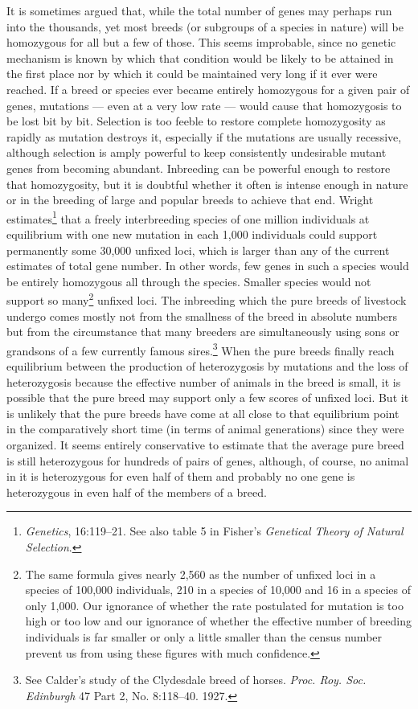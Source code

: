 It is sometimes argued that, while the total number of genes may
perhaps run into the thousands, yet most breeds (or subgroups of a
species in nature) will be homozygous for all but a few of those. This
seems improbable, since no genetic mechanism is known by which that
condition would be likely to be attained in the first place nor by which
it could be maintained very long if it ever were reached. If a breed or
species ever became entirely homozygous for a given pair of genes,
mutations --- even at a very low rate --- would cause that homozygosis to be
lost bit by bit. Selection is too feeble to restore complete homozygosity
as rapidly as mutation destroys it, especially if the mutations are usually
recessive, although selection is amply powerful to keep consistently
undesirable mutant genes from becoming abundant. Inbreeding can be
powerful enough to restore that homozygosity, but it is doubtful whether
it often is intense enough in nature or in the breeding of large and
popular breeds to achieve that end. Wright estimates\footnote{\textit{Genetics},
16:119--21. See also table 5 in Fisher's
\textit{Genetical Theory of Natural Selection}.} that a freely
interbreeding species of one million individuals at equilibrium with
one new mutation in each 1,000 individuals could support permanently
some 30,000 unfixed loci, which is larger than any of the current estimates
of total gene number. In other words, few genes in such a species
would be entirely homozygous all through the species. Smaller species
would not support so many\footnote{The same formula gives nearly 2,560 as
the number of unfixed loci in a species of 100,000 individuals, 210 in a species
of 10,000 and 16 in a species of only 1,000. Our ignorance of whether the rate
postulated for mutation is too high or too low and our ignorance of whether the
effective number of breeding individuals is far smaller or only a little smaller
than the census number prevent us from using these figures with much confidence.}
unfixed loci. The inbreeding which the pure breeds of livestock undergo comes
mostly not from the smallness of the breed in absolute numbers but from the
circumstance that many breeders are simultaneously using sons or grandsons of a
few currently famous sires.\footnote{See Calder's study of the Clydesdale breed
of horses. \textit{Proc. Roy. Soc. Edinburgh} 47 Part 2, No. 8:118--40. 1927.}
When the pure breeds finally reach equilibrium between the production of
heterozygosis by mutations and the loss of heterozygosis because the effective
number of animals in the breed is small, it is possible that the pure breed may
support only a few scores of unfixed loci. But it is unlikely that the pure
breeds have come at all close to that equilibrium point in the comparatively
short time (in terms of animal generations) since they were organized. It seems
entirely conservative to estimate that the average pure breed is still heterozygous
for hundreds of pairs of genes, although, of course, no animal in it is
heterozygous for even half of them and probably no one gene is heterozygous
in even half of the members of a breed.

